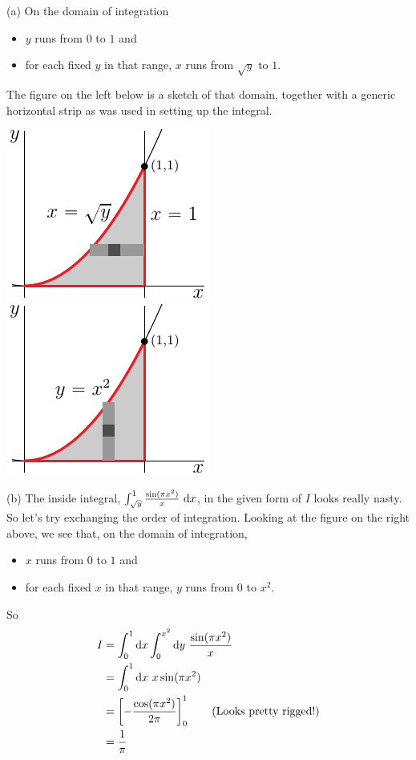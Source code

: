 \begin{solution}
(a)
On the domain of integration
\begin{itemize}
\item
$y$ runs from $0$ to $1$ and
\item
for each fixed $y$ in that range, $x$ runs from $\sqrt{y}$
to $1$.
\end{itemize}
The figure on the left below is a sketch of that domain, together with 
a generic horizontal strip as was used in setting up the integral.

\begin{center}
     \includegraphics{fig/OE08D_6h.pdf}\qquad
     \includegraphics{fig/OE08D_6v.pdf}\qquad
\end{center}

(b) The inside integral, $\int_{\sqrt{y}}^1 \frac{\sin(\pi x^2)}{x}\ \mathrm{d}x$,
in the given form of $I$ looks really nasty.  So let's try exchanging
the order of integration. Looking at the figure on the right above,
we see that, on  the domain of integration,
\begin{itemize}
\item
$x$ runs from $0$ to $1$ and
\item
for each fixed $x$ in that range, $y$ runs from $0$
to $x^2$.
\end{itemize}
So
\begin{align*}
I &= \int_0^1\mathrm{d}x\int_0^{x^2}\mathrm{d}y\ \frac{\sin(\pi x^2)}{x} \\
  &=\int_0^1\mathrm{d}x\ x\sin(\pi x^2) \\
  &=\left[-\frac{\cos(\pi x^2)}{2 \pi}\right]_0^1 
             \qquad\text{(Looks pretty rigged!)}\\
  &=\frac{1}{\pi}
\end{align*}
\end{solution}

